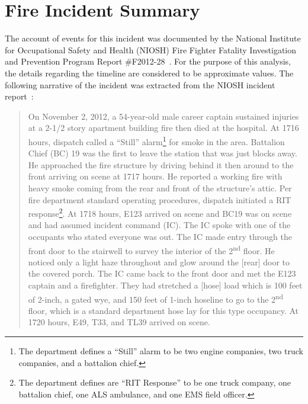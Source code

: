\documentclass[12pt,oneside]{book}
\begin{document}
\chapter{Fire Incident Summary}
\label{fire_sum}
The account of events for this incident was documented by the National Institute for Occupational Safety and Health (NIOSH) Fire Fighter Fatality Investigation and Prevention Program Report \#F2012-28~\cite{NIOSH:Bowyer}. For the purpose of this analysis, the details regarding the timeline are considered to be approximate values. The following narrative of the incident was extracted from the NIOSH incident report~\cite{NIOSH:Bowyer}:
\begin{quote}
On November 2, 2012, a 54-year-old male career captain sustained injuries at a 2-1/2 story apartment building fire then died at the hospital. At 1716 hours, dispatch called a ``Still'' alarm\footnote{The department defines a ``Still'' alarm to be two engine companies, two truck companies, and a battalion chief.} for smoke in the area. Battalion Chief (BC) 19 was the first to leave the station that was just blocks away. He approached the fire structure by driving behind it then around to the front arriving on scene at 1717 hours. He reported a working fire with heavy smoke coming from the rear and front of the structure's attic. Per fire department standard operating procedures, dispatch initiated a RIT response\footnote{The department defines are ``RIT Response'' to be one truck company, one battalion chief, one ALS ambulance, and one EMS field officer.}. At 1718 hours, E123 arrived on scene and BC19 was on scene and had assumed incident command (IC). The IC spoke with one of the occupants who stated everyone was out. The IC made entry through the front door to the stairwell to survey the interior of the 2\textsuperscript{nd} floor. He noticed only a light haze throughout and glow around the [rear] door to the covered porch. The IC came back to the front door and met the E123 captain and a firefighter. They had stretched a [hose] load which is 100 feet of 2-inch, a gated wye, and 150 feet of 1-inch hoseline to go to the 2\textsuperscript{nd} floor, which is a standard department hose lay for this type occupancy. At 1720 hours, E49, T33, and TL39 arrived on scene.


\end{quote}
\end{document}
